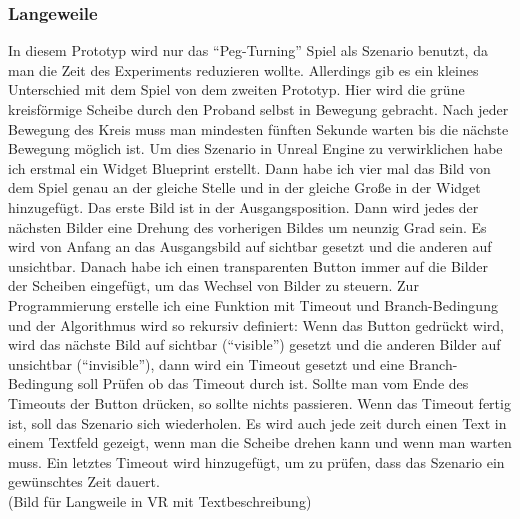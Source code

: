\subsubsection{Langeweile} \label{langeweile-4}





In diesem Prototyp wird nur das ``Peg-Turning'' Spiel als Szenario benutzt, da man die Zeit des Experiments reduzieren wollte. Allerdings gib es ein kleines Unterschied mit dem Spiel von dem zweiten Prototyp. Hier wird die gr{\"u}ne kreisf{\"o}rmige Scheibe durch den Proband selbst in Bewegung gebracht. Nach jeder Bewegung des Kreis muss man mindesten f{\"u}nften Sekunde warten bis die n{\"a}chste Bewegung m{\"o}glich ist. 
 Um dies Szenario in Unreal Engine zu verwirklichen habe ich erstmal ein Widget Blueprint erstellt. Dann habe ich vier mal das Bild von dem Spiel genau an der gleiche Stelle und in der gleiche Gro{\ss}e in der Widget hinzugef{\"u}gt. Das erste Bild ist in der Ausgangsposition. Dann wird jedes der n{\"a}chsten Bilder eine Drehung des vorherigen Bildes um neunzig Grad sein. Es wird von Anfang an das Ausgangsbild auf sichtbar gesetzt und die anderen auf unsichtbar. Danach habe ich einen transparenten Button immer auf die Bilder der Scheiben eingef{\"u}gt, um das Wechsel von Bilder zu steuern. Zur Programmierung erstelle ich eine Funktion mit Timeout und Branch-Bedingung und der Algorithmus wird so rekursiv definiert:  Wenn das Button gedr{\"u}ckt wird, wird das n{\"a}chste Bild auf sichtbar (``visible'') gesetzt und die anderen Bilder auf unsichtbar (``invisible''), dann wird ein Timeout gesetzt und eine Branch-Bedingung soll Pr{\"u}fen ob das Timeout durch ist. Sollte man vom Ende des Timeouts der Button dr{\"u}cken, so sollte nichts passieren. Wenn das Timeout fertig ist, soll das Szenario sich wiederholen. Es wird auch jede zeit durch einen Text in einem Textfeld gezeigt, wenn man die Scheibe drehen kann und wenn man warten muss. Ein letztes Timeout wird hinzugef{\"u}gt, um zu pr{\"u}fen, dass das Szenario ein gew{\"u}nschtes Zeit dauert. \\

(Bild f{\"u}r Langweile in VR mit Textbeschreibung)